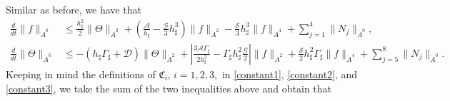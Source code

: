 \documentclass[reqno,11pt]{amsart}
\newcommand{\bh}{h_\sharp}
\newcommand{\bG}{\Gamma_\sharp}
\begin{document}
{Similar as before, we have that
\begin{align}
\frac{d}{dt}\|f\|_{\dot A^0}&\leq\frac{\bh^2}{2}\|\Theta\|_{\dot{A}^2} +\left(\frac{\mathcal{A}}{\bh}-\frac{\mathcal{G}}{3}\bh^3\right)\| f\|_{\dot{A}^2} - \frac{\mathcal{S}}{3}\bh^3\|f\|_{\dot A^4}+\sum_{j=1}^4\|N_j\|_{\dot A^0}\label{eq:1b},\\
\frac{d}{dt}\|\Theta\|_{\dot A^0}&\leq-\left(\bh \bG+\mathcal{D}\right)\|\Theta\|_{\dot{A}^2}+\left|\frac{3\mathcal{A}\bG}{2\bh^2}-\bG\bh^2\frac{\mathcal{G}}{2}\right|\|f\|_{\dot A^2}+\frac{\mathcal{S}}{2}\bh^2\bG\|f\|_{\dot A^4} +\sum_{j=5}^8\|N_j\|_{\dot A^0}.\label{eq:2b}
\end{align}
Keeping in mind the definitions of $\mathfrak{C_i}$, $i=1,2,3,$ in \eqref{constant1}, \eqref{constant2}, and \eqref{constant3}, we take the sum of the two inequalities above and obtain that

}
\end{document}
